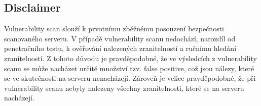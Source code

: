 \subsection{Disclaimer}
Vulnerability scan slouží k prvotnímu zběžnému posouzení bezpečnosti scanovaného serveru. V případě vulnerability scanu nedochází, narozdíl od penetračního testu, k ověřování nalezených zranitelností a ručnímu hledání zranitelností. Z tohoto důvodu je pravděpodobné, že ve výsledcích z vulnerability scanu se může nacházet určité množství tzv. false positive, což jsou nálezy, které se ve skutečnosti na serveru nenacházejí. Zároveň je velice pravděpodobné, že při vulnerability scanu nebyly nalezeny všechny zranitelnosti, které se na serveru nacházejí.

